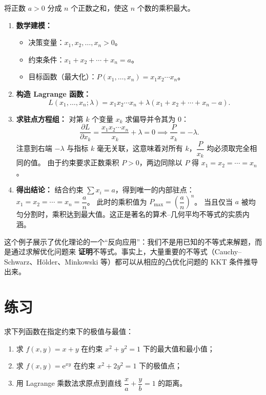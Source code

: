 \documentclass[lang=cn,11pt]{elegantbook}
\begin{document}
\begin{example}[算术--几何平均不等式的最优化证明] \label{ex:am-gm-lagrangian}
将正数 $a>0$ 分成 $n$ 个正数之和，使这 $n$ 个数的乘积最大。
\end{example}

\begin{solution}
\begin{enumerate}
  \item \textbf{数学建模：}
  \begin{itemize}
    \item 决策变量：$x_1,x_2,\dots,x_n>0$。
    \item 约束条件：$x_1+x_2+\cdots+x_n=a$。
    \item 目标函数（最大化）：$P(x_1,\dots,x_n)=x_1x_2\cdots x_n$。
  \end{itemize}
  \item \textbf{构造 Lagrange 函数：}
  \[
  L(x_1,\dots,x_n;\lambda)=x_1x_2\cdots x_n +\lambda(x_1+x_2+\cdots+x_n-a).
  \]
  \item \textbf{求驻点方程组：}
  对第 $k$ 个变量 $x_k$ 求偏导并令其为 0：
  \[
  \frac{\partial L}{\partial x_k} =\frac{x_1x_2\cdots x_n}{x_k}+\lambda=0 \implies \frac{P}{x_k}=-\lambda.
  \]
  注意到右端 $-\lambda$ 与指标 $k$ 毫无关联，这意味着对所有 $k$，$\dfrac{P}{x_k}$ 均必须取完全相同的值。
  由于约束要求正数乘积 $P>0$，两边同除以 $P$ 得 $x_1=x_2=\cdots=x_n$。
  \item \textbf{得出结论：}
  结合约束 $\sum x_i=a$，得到唯一的内部驻点：$x_1=x_2=\cdots=x_n=\dfrac{a}{n}$。
  此时的乘积值为 $P_{\max}=\left(\dfrac{a}{n}\right)^n$。
  当且仅当 $a$ 被均匀分割时，乘积达到最大值。这正是著名的算术--几何平均不等式的实质内涵。
\end{enumerate}
\end{solution}

\begin{note}[不等式与优化的深刻联系]
这个例子展示了优化理论的一个“反向应用”：我们不是用已知的不等式来解题，而是通过求解优化问题来 \textbf{证明}不等式。事实上，大量重要的不等式（Cauchy--Schwarz、Hölder、Minkowski 等）都可以从相应的凸优化问题的 KKT 条件推导出来。
\end{note}

\section{练习}

\begin{exercise}
求下列函数在指定约束下的极值与最值：
\begin{enumerate}
  \item[(1)] 求 $f(x,y)=x+y$ 在约束 $x^2+y^2=1$ 下的最大值和最小值；
  \item[(2)] 求 $f(x,y)=\mathrm{e}^{xy}$ 在约束 $x^2+2y^2=1$ 下的极值点；
  \item[(3)] 用 Lagrange 乘数法求原点到直线 $\dfrac{x}{a}+\dfrac{y}{b}=1$ 的距离。
\end{enumerate}
\end{exercise}
\end{document}
